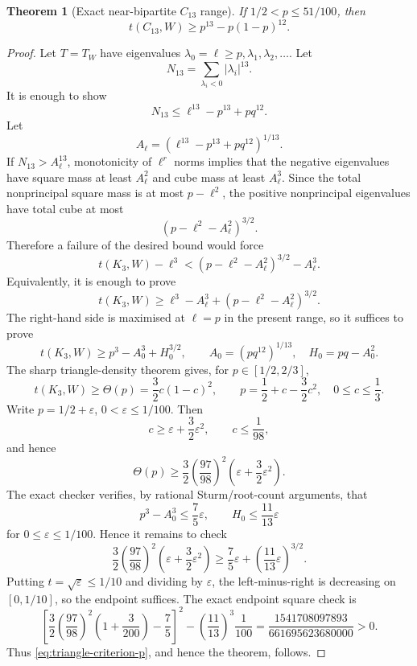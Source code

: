 \documentclass[11pt]{article}
\newtheorem{theorem}{Theorem}[section]
\newcommand{\eps}{\varepsilon}
\begin{document}
\begin{theorem}[Exact near-bipartite $C_{13}$ range]\label{thm:near-bipartite}
If $1/2<p\le51/100$, then
\[
        t(C_{13},W)\ge p^{13}-p(1-p)^{12}.
\]
\end{theorem}

\begin{proof}
Let $T=T_W$ have eigenvalues $\lambda_0=\ell\ge p,\lambda_1,\lambda_2,\ldots$.
Let
\[
        N_{13}=\sum_{\lambda_i<0}|\lambda_i|^{13}.
\]
It is enough to show
\[
        N_{13}\le \ell^{13}-p^{13}+pq^{12}.
\]
Let
\[
        A_\ell=(\ell^{13}-p^{13}+pq^{12})^{1/13}.
\]
If $N_{13}>A_\ell^{13}$, monotonicity of $\ell^r$ norms implies that the
negative eigenvalues have square mass at least $A_\ell^2$ and cube mass at least
$A_\ell^3$.  Since the total nonprincipal square mass is at most $p-\ell^2$,
the positive nonprincipal eigenvalues have total cube at most
\[
        (p-\ell^2-A_\ell^2)^{3/2}.
\]
Therefore a failure of the desired bound would force
\[
        t(K_3,W)-\ell^3 < (p-\ell^2-A_\ell^2)^{3/2}-A_\ell^3.
\]
Equivalently, it is enough to prove
\begin{equation}\label{eq:triangle-criterion-l}
        t(K_3,W)\ge \ell^3-A_\ell^3+(p-\ell^2-A_\ell^2)^{3/2}.
\end{equation}
The right-hand side is maximised at $\ell=p$ in the present range, so it
suffices to prove
\begin{equation}\label{eq:triangle-criterion-p}
        t(K_3,W)\ge p^3-A_0^3+H_0^{3/2},
        \qquad
        A_0=(pq^{12})^{1/13},\quad H_0=pq-A_0^2.
\end{equation}
The sharp triangle-density theorem gives, for $p\in[1/2,2/3]$,
\[
        t(K_3,W)\ge \Theta(p)=\frac32 c(1-c)^2,
        \qquad p=\frac12+c-\frac32c^2,
        \quad 0\le c\le\frac13.
\]
Write $p=1/2+\eps$, $0<\eps\le1/100$.  Then
\[
        c\ge \eps+\frac32\eps^2,
        \qquad c\le\frac1{98},
\]
and hence
\[
        \Theta(p)\ge
        \frac32\left(\frac{97}{98}\right)^2
        \left(\eps+\frac32\eps^2\right).
\]
The exact checker verifies, by rational Sturm/root-count arguments, that
\[
        p^3-A_0^3\le \frac75\eps,
        \qquad
        H_0\le \frac{11}{13}\eps
\]
for $0\le\eps\le1/100$.  Hence it remains to check
\[
        \frac32\left(\frac{97}{98}\right)^2
        \left(\eps+\frac32\eps^2\right)
        \ge
        \frac75\eps+\left(\frac{11}{13}\eps\right)^{3/2}.
\]
Putting $t=\sqrt{\eps}\le1/10$ and dividing by $\eps$, the left-minus-right is
decreasing on $[0,1/10]$, so the endpoint suffices.  The exact endpoint square
check is
\[
\left[
\frac32\left(\frac{97}{98}\right)^2\left(1+\frac{3}{200}\right)-\frac75
\right]^2
-
\left(\frac{11}{13}\right)^3\frac1{100}
=
\frac{1541708097893}{661695623680000}>0.
\]
Thus \eqref{eq:triangle-criterion-p}, and hence the theorem, follows.
\end{proof}
\end{document}
